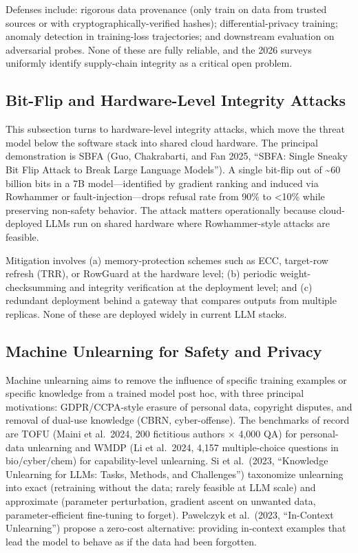 \documentclass{article}
\begin{document}
Defenses include: rigorous data provenance (only train on data from trusted sources or with cryptographically-verified hashes); differential-privacy training; anomaly detection in training-loss trajectories; and downstream evaluation on adversarial probes. None of these are fully reliable, and the 2026 surveys uniformly identify supply-chain integrity as a critical open problem.

\subsection{Bit-Flip and Hardware-Level Integrity Attacks}\label{bit-flip-and-hardware-level-integrity-attacks}

This subsection turns to hardware-level integrity attacks, which move the threat model below the software stack into shared cloud hardware. The principal demonstration is SBFA (Guo, Chakrabarti, and Fan 2025, ``SBFA: Single Sneaky Bit Flip Attack to Break Large Language Models''). A single bit-flip out of \textasciitilde60 billion bits in a 7B model---identified by gradient ranking and induced via Rowhammer or fault-injection---drops refusal rate from 90\% to \textless10\% while preserving non-safety behavior. The attack matters operationally because cloud-deployed LLMs run on shared hardware where Rowhammer-style attacks are feasible.

Mitigation involves (a) memory-protection schemes such as ECC, target-row refresh (TRR), or RowGuard at the hardware level; (b) periodic weight-checksumming and integrity verification at the deployment level; and (c) redundant deployment behind a gateway that compares outputs from multiple replicas. None of these are deployed widely in current LLM stacks.

\subsection{Machine Unlearning for Safety and Privacy}\label{machine-unlearning-for-safety-and-privacy}

Machine unlearning aims to remove the influence of specific training examples or specific knowledge from a trained model post hoc, with three principal motivations: GDPR/CCPA-style erasure of personal data, copyright disputes, and removal of dual-use knowledge (CBRN, cyber-offense). The benchmarks of record are TOFU (Maini et al.~2024, 200 fictitious authors × 4,000 QA) for personal-data unlearning and WMDP (Li et al.~2024, 4,157 multiple-choice questions in bio/cyber/chem) for capability-level unlearning. Si et al.~(2023, ``Knowledge Unlearning for LLMs: Tasks, Methods, and Challenges'') taxonomize unlearning into exact (retraining without the data; rarely feasible at LLM scale) and approximate (parameter perturbation, gradient ascent on unwanted data, parameter-efficient fine-tuning to forget). Pawelczyk et al.~(2023, ``In-Context Unlearning'') propose a zero-cost alternative: providing in-context examples that lead the model to behave as if the data had been forgotten.
\end{document}
